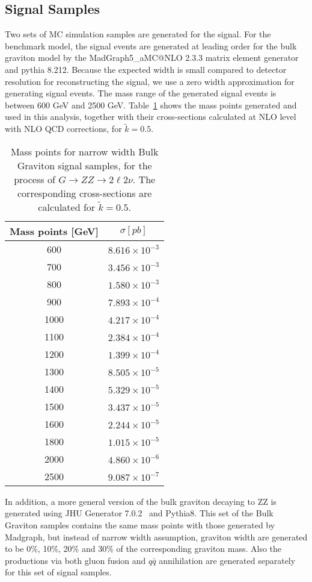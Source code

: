 \subsection{Signal Samples}
Two sets of MC simulation samples are generated for the signal. For the benchmark model, the signal events are generated at leading order for the bulk graviton model by the MadGraph5\_aMC@NLO 2.3.3 matrix element generator and pythia 8.212. Because the expected width is small compared to detector resolution for reconstructing the signal, we use a zero width approximation for generating signal events. The mass range of the generated signal events is between 600 GeV and 2500 GeV. Table~\ref{tab:sample_massps} shows the mass points generated and used in this analysis, together with their cross-sections calculated at NLO level with NLO QCD corrections, for $\tilde{k}=0.5$.

\begin{table}[htbp]
  \begin{center}
    \caption{
      Mass points for narrow width Bulk Graviton signal samples, for the process of $G\rightarrow ZZ\rightarrow 2\ell 2\nu$. The corresponding cross-sections are calculated for $\tilde{k}=0.5$.
      \label{tab:sample_massps}}
    \begin{tabular}{c c}
      \hline\hline
      Mass points [GeV] & $\sigma [pb]$\\
      \hline
      600 &  $8.616\times 10^{-3}$ \\
      700 &  $3.456\times 10^{-3}$ \\
      800 &  $1.580\times 10^{-3}$ \\
      900 &  $7.893\times 10^{-4}$ \\
      1000 & $4.217\times 10^{-4}$ \\
      1100 & $2.384\times 10^{-4}$ \\
      1200 & $1.399\times 10^{-4}$ \\
      1300 & $8.505\times 10^{-5}$ \\
      1400 & $5.329\times 10^{-5}$ \\
      1500 & $3.437\times 10^{-5}$ \\
      1600 & $2.244\times 10^{-5}$ \\
      1800 & $1.015\times 10^{-5}$ \\
      2000 & $4.860\times 10^{-6}$ \\
      2500 & $9.087\times 10^{-7}$ \\
      \hline\hline
    \end{tabular}
  \end{center}
\end{table}


In addition, a more general version of the bulk graviton decaying to ZZ is generated using JHU Generator 7.0.2~\cite{sample_jhugen1,sample_jhugen2,sample_jhugen3} and Pythia8. This set of the Bulk Graviton samples contains the same mass points with those generated by Madgraph, but instead of narrow width assumption, graviton width are generated to be 0\%, 10\%, 20\% and 30\% of the corresponding graviton mass. Also the productions via both gluon fusion and $q\bar{q}$ annihilation are generated separately for this set of signal samples.
